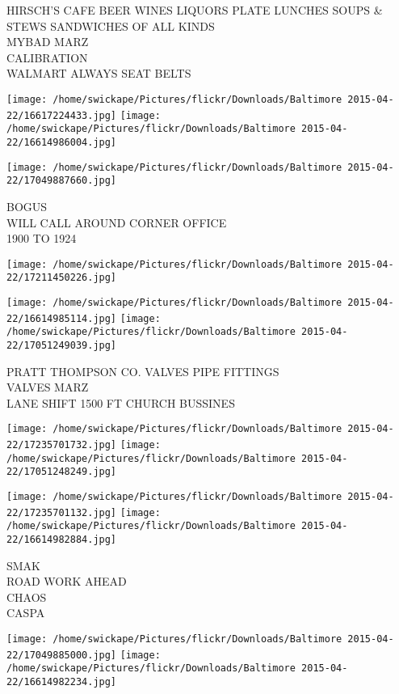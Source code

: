 \documentclass[10pt,letterpaper]{article}
\begin{document}
HIRSCH'S CAFE BEER WINES LIQUORS PLATE LUNCHES SOUPS \& STEWS SANDWICHES OF ALL KINDS\\
MYBAD MARZ\\
CALIBRATION\\
WALMART ALWAYS SEAT BELTS
\pagebreak

\texttt{[image: /home/swickape/Pictures/flickr/Downloads/Baltimore 2015-04-22/16617224433.jpg]}
\texttt{[image: /home/swickape/Pictures/flickr/Downloads/Baltimore 2015-04-22/16614986004.jpg]}

\vspace{0.25in}
\texttt{[image: /home/swickape/Pictures/flickr/Downloads/Baltimore 2015-04-22/17049887660.jpg]}

BOGUS\\
WILL CALL AROUND CORNER OFFICE\\
1900 TO 1924
\pagebreak

\texttt{[image: /home/swickape/Pictures/flickr/Downloads/Baltimore 2015-04-22/17211450226.jpg]}

\vspace{0.25in}
\texttt{[image: /home/swickape/Pictures/flickr/Downloads/Baltimore 2015-04-22/16614985114.jpg]}
\texttt{[image: /home/swickape/Pictures/flickr/Downloads/Baltimore 2015-04-22/17051249039.jpg]}

PRATT THOMPSON CO. VALVES PIPE FITTINGS\\
VALVES MARZ\\
LANE SHIFT 1500 FT CHURCH BUSSINES
\pagebreak

\texttt{[image: /home/swickape/Pictures/flickr/Downloads/Baltimore 2015-04-22/17235701732.jpg]}
\texttt{[image: /home/swickape/Pictures/flickr/Downloads/Baltimore 2015-04-22/17051248249.jpg]}

\texttt{[image: /home/swickape/Pictures/flickr/Downloads/Baltimore 2015-04-22/17235701132.jpg]}
\texttt{[image: /home/swickape/Pictures/flickr/Downloads/Baltimore 2015-04-22/16614982884.jpg]}

SMAK\\
ROAD WORK AHEAD\\
CHAOS\\
CASPA
\pagebreak

\texttt{[image: /home/swickape/Pictures/flickr/Downloads/Baltimore 2015-04-22/17049885000.jpg]}
\texttt{[image: /home/swickape/Pictures/flickr/Downloads/Baltimore 2015-04-22/16614982234.jpg]}
\end{document}
